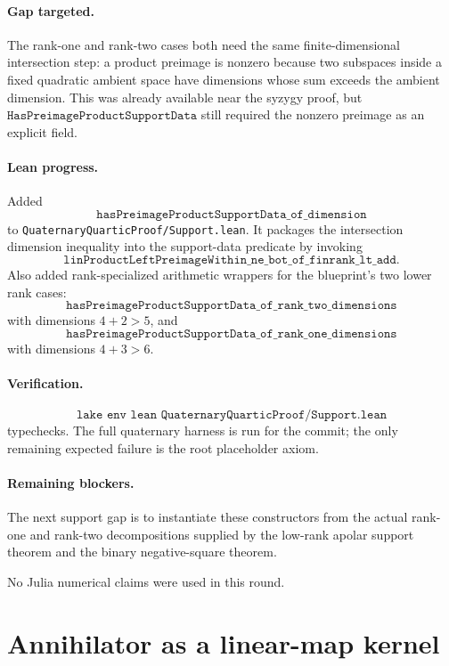\documentclass[11pt]{article}
\begin{document}
\paragraph{Gap targeted.}
The rank-one and rank-two cases both need the same finite-dimensional
intersection step: a product preimage is nonzero because two subspaces inside a
fixed quadratic ambient space have dimensions whose sum exceeds the ambient
dimension.  This was already available near the syzygy proof, but
\(\texttt{HasPreimageProductSupportData}\) still required the nonzero
preimage as an explicit field.

\paragraph{Lean progress.}
Added
\[
\texttt{hasPreimageProductSupportData\_of\_dimension}
\]
to \texttt{QuaternaryQuarticProof/Support.lean}.  It packages the intersection
dimension inequality into the support-data predicate by invoking
\[
\texttt{linProductLeftPreimageWithin\_ne\_bot\_of\_finrank\_lt\_add}.
\]
Also added rank-specialized arithmetic wrappers for the blueprint's two lower
rank cases:
\[
\texttt{hasPreimageProductSupportData\_of\_rank\_two\_dimensions}
\]
with dimensions \(4+2>5\), and
\[
\texttt{hasPreimageProductSupportData\_of\_rank\_one\_dimensions}
\]
with dimensions \(4+3>6\).

\paragraph{Verification.}
\[
\texttt{lake env lean QuaternaryQuarticProof/Support.lean}
\]
typechecks.  The full quaternary harness is run for the commit; the only
remaining expected failure is the root placeholder axiom.

\paragraph{Remaining blockers.}
The next support gap is to instantiate these constructors from the actual
rank-one and rank-two decompositions supplied by the low-rank apolar support
theorem and the binary negative-square theorem.

No Julia numerical claims were used in this round.

\section*{Annihilator as a linear-map kernel}
\end{document}
